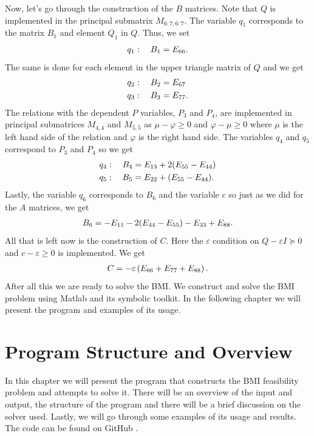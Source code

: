 \documentclass[a4paper,12pt,twoside,BCOR=10mm]{scrbook}
\begin{document}
Now, let's go through the construction of the $B$ matrices. Note that $Q$ is implemented in the principal submatrix $M_{6:7, 6:7}$. The variable $q_1$ corresponds to the matrix $B_1$ and element $Q_1$ in $Q$. Thus, we set
\begin{align*}
    q_1: \quad B_1 = E_{66}.
\end{align*}
The same is done for each element in the upper triangle matrix of $Q$ and we get
\begin{align*}
    &q_2: \quad B_2 = E_{67}\\
    &q_3: \quad B_3 = E_{77}.
\end{align*}
The relations with the dependent $P$ variables, $P_3$ and $P_4$, are implemented in principal submatrices $M_{4,4}$ and $M_{5,5}$ as $\mu - \varphi \geq 0$ and $\varphi - \mu \geq 0$ where $\mu$ is the left hand side of the relation and $\varphi$ is the right hand side. 
The variables $q_4$ and $q_5$ correspond to $P_3$ and $P_4$ so we get
\begin{align*}
    &q_4: \quad B_4 = E_{13} + 2(E_{55} - E_{44})\\
    &q_5: \quad B_5 = E_{22} + (E_{55} - E_{44}).
\end{align*}
Lastly, the variable $q_6$ corresponds to $B_6$ and the variable $c$ so just as we did for the $A$ matrices, we get
\begin{align*}
    B_6 = -E_{11} - 2(E_{44} - E_{55}) - E_{33} + E_{88}.
\end{align*}
All that is left now is the construction of $C$. Here the $\varepsilon$ condition on $Q - \varepsilon I \succeq 0$ and $c - \varepsilon \geq 0$ is implemented. We get
\begin{align*}
    C = -\varepsilon\left(E_{66} + E_{77} + E_{88}\right).
\end{align*}
After all this we are ready to solve the BMI. We construct and solve the BMI problem using Matlab and its symbolic toolkit. In the following chapter we will present the program and examples of its usage.


\chapter{Program Structure and Overview}\label{KafliProgramStructure}
In this chapter we will present the program that constructs the BMI feasibility problem and attempts to solve it. There will be an overview of the input and output, the structure of the program and there will be a brief discussion on the solver used. Lastly, we will go through some examples of its usage and results. The code can be found on GitHub \citep{Mverk2022}.
\end{document}
